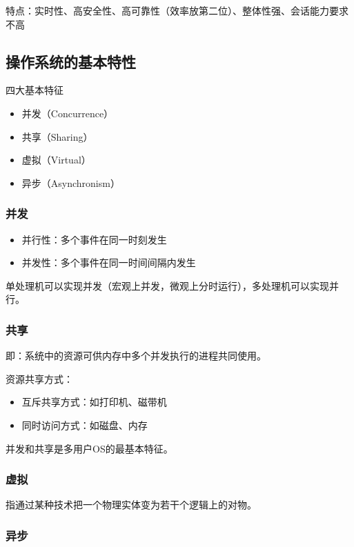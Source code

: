 \documentclass[12pt, a4paper, oneside]{ctexart}
\begin{document}
特点：实时性、高安全性、高可靠性（效率放第二位）、整体性强、会话能力要求不高

\subsection{操作系统的基本特性}

四大基本特征
\begin{itemize}
    \item 并发（Concurrence）
    \item 共享（Sharing）
    \item 虚拟（Virtual）
    \item 异步（Asynchronism）
\end{itemize}

\subsubsection{并发}

\begin{itemize}
    \item 并行性：多个事件在同一时刻发生
    \item 并发性：多个事件在同一时间间隔内发生
\end{itemize}

单处理机可以实现并发（宏观上并发，微观上分时运行），多处理机可以实现并行。

\subsubsection{共享}

即：系统中的资源可供内存中多个并发执行的进程共同使用。

资源共享方式：
\begin{itemize}
    \item 互斥共享方式：如打印机、磁带机
    \item 同时访问方式：如磁盘、内存
\end{itemize}

并发和共享是多用户OS的最基本特征。

\subsubsection{虚拟}

指通过某种技术把一个物理实体变为若干个逻辑上的对物。

\subsubsection{异步}
\end{document}
